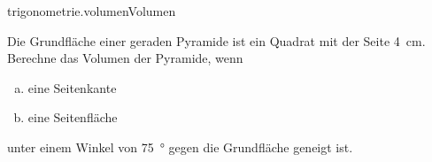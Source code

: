 \begin{exercise}{trigonometrie.volumen}{Volumen}
  \ifproblem\problem\par
    Die Grundfläche einer geraden Pyramide ist ein Quadrat
    mit der Seite \SI{4}{\centi\metre}. Berechne das Volumen
    der Pyramide, wenn
    \begin{enumerate}[a)]
      \item eine Seitenkante
      \item eine Seitenfläche
    \end{enumerate}
    unter einem Winkel von \SI{75}{\degree} gegen die Grundfläche
    geneigt ist.
  \fi
\end{exercise}
